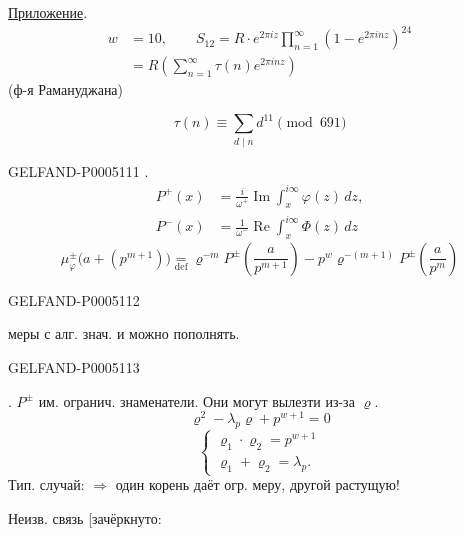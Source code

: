\uline{Приложение}.
\[
\begin{aligned}
w&=10,\qquad S_{12}=R\cdot e^{2\pi iz}
 \prod_{n=1}^\infty(1-e^{2\pi inz})^{24}\\
 &=R\left(\sum_{n=1}^\infty\tau(n)e^{2\pi inz}\right)
\end{aligned}
\]
\hfill (ф-я Рамануджана)\par

\[
\tau(n)\equiv\sum_{d\mid n}d^{11}\pmod{691}
\]


\begin{GelfandAdjacentEvidence}{GELFAND-P000511}{1}
.
\[
\begin{aligned}
P^+(x)&=\frac{i}{\omega^+}\operatorname{Im}\int_x^{i\infty}\varphi(z)\,dz,\\
P^-(x)&=\frac{1}{\omega^-}\operatorname{Re}\int_x^{i\infty}\Phi(z)\,dz
\end{aligned}
\]
\[
\mu_\varphi^\pm\bigl(a+(p^{m+1})\bigr)
\underset{\mathrm{def}}{=}
\varrho^{-m}P^\pm\left(\frac{a}{p^{m+1}}\right)
-p^w\varrho^{-(m+1)}P^\pm\left(\frac{a}{p^m}\right)
\]
\end{GelfandAdjacentEvidence}
\begin{GelfandAdjacentEvidence}{GELFAND-P000511}{2}

меры с алг. знач. и можно пополнять.
\end{GelfandAdjacentEvidence}
\begin{GelfandAdjacentEvidence}{GELFAND-P000511}{3}


. $P^\pm$ им. огранич. знаменатели.
Они могут вылезти из-за $\varrho$.
\[
\varrho^2-\lambda_p\varrho+p^{w+1}=0
\]
\[
\begin{cases}
\varrho_1\cdot\varrho_2=p^{w+1}\\
\varrho_1+\varrho_2=\lambda_p.
\end{cases}
\]
Тип. случай: 
$\Rightarrow$ один корень даёт огр. меру, другой растущую!

Неизв. связь [зачёркнуто:
\end{GelfandAdjacentEvidence}
